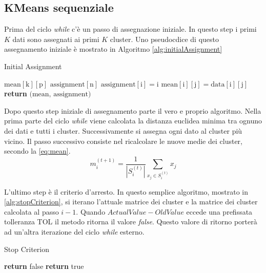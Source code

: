 \documentclass[10pt,twocolumn,letterpaper]{article}
\begin{document}
\subsection{KMeans sequenziale}

Prima del ciclo \textit{while} c'è un passo di assegnazione iniziale. In questo step i primi $K$ dati sono assegnati ai primi $K$ cluster. Uno pseudocdice di questo assegnamento iniziale è mostrato in Algoritmo \ref{alg:initialAssignment}
\begin{algorithm}
\caption{Initial Assignment}
\label{alg:initialAssignment}
\begin{algorithmic}[1]
\State $\text{mean}[\text{k}][\text{p}]$
\State $\text{assignment}[\text{n}]$
\State $\text{assignment}[\text{i}] = \text{i}$
\State $\text{mean}[\text{i}][\text{j}] = \text{data}[\text{i}][\text{j}]$
\EndFor
\EndFor
\State \textbf{return} $\text{(mean, assignment)}$
\EndProcedure
\end{algorithmic}
\end{algorithm}

Dopo questo step iniziale di assegnamento parte il vero e proprio algoritmo. Nella prima parte del ciclo \textit{while} viene calcolata la distanza euclidea minima tra ognuno dei dati e tutti i cluster. Successivamente si assegna ogni dato al cluster più vicino.
Il passo successivo consiste nel ricalcolare le nuove medie dei cluster, secondo la \eqref{eq:mean}. 
\begin{equation}
\label{eq:mean}
m_i^{(t+1)} = \frac{1}{|S^{(t)}_i|} \displaystyle\sum_{x_{j} \in S^{(t)}_i} x_j 
\end{equation}


L'ultimo step è il criterio d'arresto. In questo semplice algoritmo, mostrato in \ref{alg:stopCriterion}, si iterano l'attuale matrice dei cluster e la matrice dei cluster calcolata al passo $i-1$. Quando $ActualValue - OldValue$ eccede una prefissata tolleranza TOL  il metodo ritorna il valore \textit{false}. Questo valore di ritorno porterà ad un'altra iterazione del ciclo \textit{while} esterno.

\begin{algorithm}
\caption{Stop Criterion}
\label{alg:stopCriterion}
\begin{algorithmic}[1]
\State \textbf{return} false
\EndIf
\EndFor
\State \textbf{return} true
\EndProcedure
\end{algorithmic}
\end{algorithm}
\end{document}
